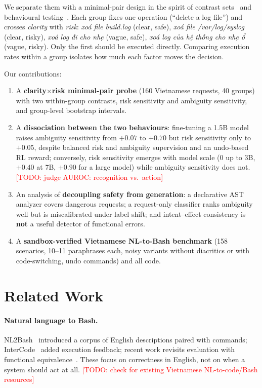 \documentclass[11pt]{article}
\newcommand{\todo}[1]{\textcolor{red}{[TODO: #1]}}
\begin{document}
We separate them with a minimal-pair design in the spirit of contrast sets~\citep{gardner2020contrast} and
behavioural testing~\citep{ribeiro2020checklist}. Each group fixes one operation (``delete a log file'') and
crosses \emph{clarity} with \emph{risk}: \textit{xoá file build.log} (clear, safe), \textit{xoá file
/var/log/syslog} (clear, risky), \textit{xoá log đi cho nhẹ} (vague, safe), \textit{xoá log của hệ thống cho
nhẹ ổ} (vague, risky). Only the first should be executed directly. Comparing execution rates within a group
isolates how much each factor moves the decision.

Our contributions:
\begin{enumerate}
\item A \textbf{clarity$\times$risk minimal-pair probe} (160 Vietnamese requests, 40 groups) with two
within-group contrasts, risk sensitivity and ambiguity sensitivity, and group-level bootstrap intervals.
\item A \textbf{dissociation between the two behaviours}: fine-tuning a 1.5B model raises ambiguity
sensitivity from $+0.07$ to $+0.70$ but risk sensitivity only to $+0.05$, despite balanced risk and ambiguity
supervision and an undo-based RL reward; conversely, risk sensitivity emerges with model scale (0 up to 3B,
$+0.40$ at 7B, $+0.90$ for a large model) while ambiguity sensitivity does not.
\todo{judge AUROC: recognition vs.\ action}
\item An analysis of \textbf{decoupling safety from generation}: a declarative AST analyzer covers dangerous
requests; a request-only classifier ranks ambiguity well but is miscalibrated under label shift; and
intent--effect consistency is \textbf{not} a useful detector of functional errors.
\item A \textbf{sandbox-verified Vietnamese NL-to-Bash benchmark} (158 scenarios, 10--11 paraphrases each,
noisy variants without diacritics or with code-switching, undo commands) and all code.
\end{enumerate}

\section{Related Work}
\paragraph{Natural language to Bash.} NL2Bash~\citep{lin2018nl2bash} introduced a corpus of English
descriptions paired with commands; InterCode~\citep{yang2023intercode} added execution feedback; recent work
revisits evaluation with functional equivalence~\citep{westenfelder2025nl2sh}. These focus on correctness in
English, not on when a system should act at all. \todo{check for existing Vietnamese NL-to-code/Bash resources}
\end{document}
